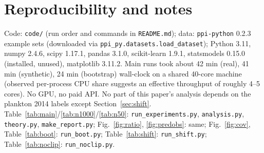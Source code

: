 \documentclass{article}
\begin{document}
\section{Reproducibility and notes}
Code: \texttt{code/} (run order and commands in \texttt{README.md}); data: \texttt{ppi-python} 0.2.3 example sets (downloaded via \texttt{ppi\_py.datasets.load\_dataset}); Python 3.11, numpy 2.4.6, scipy 1.17.1, pandas 3.1.0, scikit-learn 1.9.1, statsmodels 0.15.0 (installed, unused), matplotlib 3.11.2. Main runs took about 42 min (real), 41 min (synthetic), 24 min (bootstrap) wall-clock on a shared 40-core machine (observed per-process CPU share suggests an effective throughput of roughly 4--5 cores). No GPU, no paid API. No part of this paper's analysis depends on the plankton 2014 labels except Section~\ref{sec:shift}. Table~\ref{tab:main}/\ref{tab:n1000}/\ref{tab:n50}: \texttt{run\_experiments.py}, \texttt{analysis.py}, \texttt{theory.py}, \texttt{make\_report.py}; Fig.~\ref{fig:ratio}, \ref{fig:predobs}: same; Fig.~\ref{fig:cov}, Table~\ref{tab:boot}: \texttt{run\_boot.py}; Table~\ref{tab:shift}: \texttt{run\_shift.py}; Table~\ref{tab:noclip}: \texttt{run\_noclip.py}.

\newpage

\end{document}

